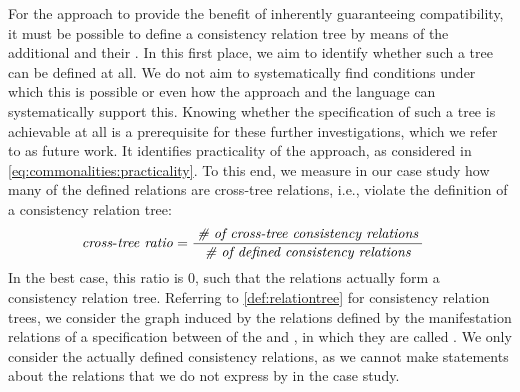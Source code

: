 For the \commonalities approach to provide the benefit of inherently guaranteeing compatibility, it must be possible to define a consistency relation tree by means of the additional \conceptmetamodels and their \commonalities.
In this first place, we aim to identify whether such a tree can be defined at all.
We do not aim to systematically find conditions under which this is possible or even how the \commonalities approach and the \commonalities language can systematically support this.
Knowing whether the specification of such a tree is achievable at all is a prerequisite for these further investigations, which we refer to as future work.
It identifies practicality of the approach, as considered in \autoref{eq:commonalities:practicality}.
To this end, we measure in our case study how many of the defined relations are cross-tree relations, i.e., violate the definition of a consistency relation tree:
\begin{align*}
    &
    \mathit{cross\mbox{-}tree\ ratio} = \frac{\; \textit{\# of cross-tree consistency relations} \;}{\; \textit{\# of defined consistency relations} \;}
\end{align*}
In the best case, this ratio is $0$, such that the relations actually form a consistency relation tree.
Referring to \autoref{def:relationtree} for consistency relation trees, we consider the graph induced by the relations defined by the manifestation relations of a \commonalities specification between \metaclasses of the \concretemetamodels and \conceptmetamodels, in which they are called \commonalities.
We only consider the actually defined consistency relations, as we cannot make statements about the relations that we do not express by \commonalities in the case study.

